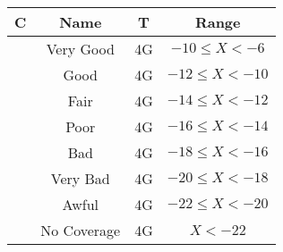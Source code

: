 \begin{tabular}{|c|c|c|c|}\hline
\rowcolor{Plum!20}
C&Name&T&Range\\\hline\hline
\rowcolor{White}\cellcolor[HTML]{00a032} &Very Good&4G&$-10\leq X<-6$\\\hline
\rowcolor{Gray!20}\cellcolor[HTML]{00d228} &Good&4G&$-12\leq X<-10$\\\hline
\rowcolor{White}\cellcolor[HTML]{ffff00} &Fair&4G&$-14\leq X<-12$\\\hline
\rowcolor{Gray!20}\cellcolor[HTML]{ffaa00} &Poor&4G&$-16\leq X<-14$\\\hline
\rowcolor{White}\cellcolor[HTML]{fa6400} &Bad&4G&$-18\leq X<-16$\\\hline
\rowcolor{Gray!20}\cellcolor[HTML]{dc143c} &Very Bad&4G&$-20\leq X<-18$\\\hline
\rowcolor{White}\cellcolor[HTML]{820000} &Awful&4G&$-22\leq X<-20$\\\hline
\rowcolor{Gray!20}\cellcolor[HTML]{aaaaaa} &No Coverage&4G&$X<-22$\\\hline
\end{tabular}
